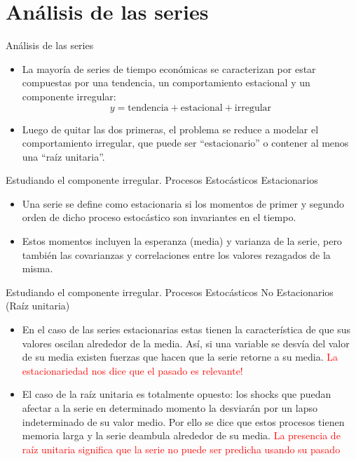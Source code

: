 \section{Análisis de las series}

\begin{frame}{Análisis de las series}
	\begin{itemize}
		\item La mayoría de series de tiempo económicas se caracterizan por estar compuestas por una tendencia, un comportamiento estacional y un componente irregular:
			$$y = \text{tendencia} + \text{estacional} + \text{irregular}$$
		\item Luego de quitar las dos primeras, el problema se reduce a modelar el comportamiento irregular, que puede ser ``estacionario'' o contener al menos una ``raíz unitaria''.
	\end{itemize}
\end{frame}
\begin{frame}{Estudiando el componente irregular. Procesos Estocásticos Estacionarios}
	\begin{itemize}
		\item  Una serie se define como estacionaria si los momentos de primer y segundo orden de dicho proceso estocástico son invariantes en el tiempo.
		\item Estos momentos incluyen la esperanza (media) y varianza de la serie, pero también las covarianzas y correlaciones entre los valores rezagados de la misma.
	\end{itemize}
\end{frame}
\begin{frame}{Estudiando el componente irregular. Procesos Estocásticos No Estacionarios (Raíz unitaria)}
	\begin{itemize}
		\item En el caso de las series estacionarias estas tienen la característica de que sus valores oscilan alrededor de la media. Así, si una variable se desvía del valor de su media existen fuerzas que hacen que la serie retorne a su media. \textcolor{red}{La estacionariedad nos dice que el pasado es relevante!}
		\item El caso de la raíz unitaria es totalmente opuesto: los shocks que puedan afectar a la serie en determinado momento la desviarán por un lapso indeterminado de su valor medio. Por ello se dice que estos procesos tienen memoria larga y la serie deambula alrededor de su media. \textcolor{red}{La presencia de raíz unitaria significa que la serie no puede ser predicha usando su pasado}
	\end{itemize}
\end{frame}
